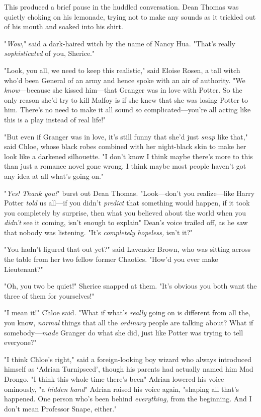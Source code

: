 This produced a brief pause in the huddled conversation. Dean Thomas was
quietly choking on his lemonade, trying not to make any sounds as it trickled
out of his mouth and soaked into his shirt.

"\emph{Wow,}" said a dark-haired witch by the name of Nancy Hua. "That's
really{\el} \emph{sophisticated} of you, Sherice."

"Look, you all, we need to keep this realistic," said Eloise Rosen, a tall
witch who'd been General of an army and hence spoke with an air of authority.
"We \emph{know}---because she kissed him---that Granger was in love with
Potter. So the only reason she'd try to kill Malfoy is if she knew that she was
losing Potter to him. There's no need to make it all sound so
complicated---you're all acting like this is a play instead of real life!"

"But even if Granger was in love, it's still funny that she'd just \emph{snap}
like that," said Chloe, whose black robes combined with her night-black skin to
make her look like a darkened silhouette. "I don't know{\el} I think maybe
there's more to this than just a romance novel gone wrong. I think maybe most
people haven't got any idea at all what's going on."

"\emph{Yes! Thank you!}" burst out Dean Thomas. "Look---don't you
realize---like Harry Potter \emph{told} us all---if you didn't \emph{predict}
that something would happen, if it took you completely by surprise, then what
you believed about the world when you \emph{didn't} see it coming, isn't enough
to explain{\el}" Dean's voice trailed off, as he saw that nobody was
listening. "It's \emph{completely hopeless,} isn't it?"

"You hadn't figured that out yet?" said Lavender Brown, who was sitting across
the table from her two fellow former Chaotics. "How'd you ever make Lieutenant?"

"Oh, you two be quiet!" Sherice snapped at them. "It's obvious you both want
the three of them for yourselves!"

"I mean it!" Chloe said. "What if what's \emph{really} going on is different
from all the, you know, \emph{normal} things that all the \emph{ordinary}
people are talking about? What if somebody---\emph{made} Granger do what she
did, just like Potter was trying to tell everyone?"

"I think Chloe's right," said a foreign-looking boy wizard who always
introduced himself as `Adrian Turnipseed', though his parents had actually
named him Mad Drongo. "I think this whole time there's been{\el}" Adrian
lowered his voice ominously, "{\el}a \emph{hidden hand}{\el}" Adrian
raised his voice again, "shaping all that's happened. One person who's been
behind \emph{everything,} from the beginning. And I don't mean Professor Snape,
either."

